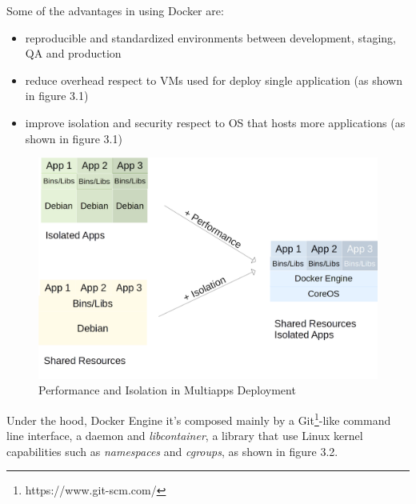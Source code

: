 Some of the advantages in using Docker are:

\begin{itemize}

\item
  reproducible and standardized environments between development,
  staging, QA and production
\item
  reduce overhead respect to VMs used for deploy single application (as shown in figure 3.1)
\item
  improve isolation and security respect to OS that hosts more applications (as shown in figure 3.1)
\end{itemize}

\begin{figure}[htbp]
\centering
\includegraphics{media/ch3-docker_multiapps.png}
\caption{Performance and Isolation in Multiapps Deployment}
\end{figure}

Under the hood, Docker Engine it's composed mainly by a Git\footnote{https://www.git-scm.com/}-like command
line interface, a daemon and \textit{libcontainer}, a library that use
Linux kernel capabilities such as \textit{namespaces} and \textit{cgroups}, as shown in figure 3.2.

